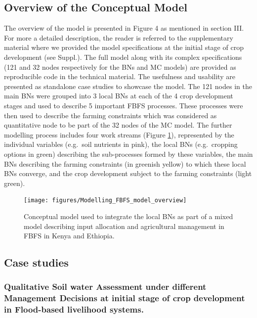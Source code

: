 \documentclass[11pt,preprint]{article}
\begin{document}
\hypertarget{overview-of-the-conceptual-model}{%
\subsection{Overview of the Conceptual
Model}\label{overview-of-the-conceptual-model}}

The overview of the model is presented in Figure 4 as mentioned in
section III. For more a detailed description, the reader is referred to
the supplementary material where we provided the model specifications at
the initial stage of crop development (see Suppl.). The full model along
with its complex specifications (121 and 32 nodes respectively for the
BNs and MC models) are provided as reproducible code in the technical
material. The usefulness and usability are presented as standalone case
studies to showcase the model. The 121 nodes in the main BNs were
grouped into 3 local BNs at each of the 4 crop development stages and
used to describe 5 important FBFS processes. These processes were then
used to describe the farming constraints which was considered as
quantitative node to be part of the 32 nodes of the MC model. The
further modelling process includes four work streams (Figure
\ref{Figure_4}), represented by the individual variables (e.g.~soil
nutrients in pink), the local BNs (e.g.~cropping options in green)
describing the sub-processes formed by these variables, the main BNs
describing the farming constraints (in greenish yellow) to which these
local BNs converge, and the crop development subject to the farming
constraints (light green).

\begin{figure}[!htbp]
    \centering
    \texttt{[image: figures/Modelling\_FBFS\_model\_overview]}
    \caption{Conceptual model used to integrate the local BNs as part of a mixed model describing     input allocation and agricultural management in FBFS in Kenya and Ethiopia.
    \label{Figure_4}}
\end{figure}

\hypertarget{case-studies}{%
\subsection{Case studies}\label{case-studies}}

\hypertarget{qualitative-soil-water-assessment-under-different-management-decisions-at-initial-stage-of-crop-development-in-flood-based-livelihood-systems.}{%
\subsubsection{Qualitative Soil water Assessment under different
Management Decisions at initial stage of crop development in Flood-based
livelihood
systems.}\label{qualitative-soil-water-assessment-under-different-management-decisions-at-initial-stage-of-crop-development-in-flood-based-livelihood-systems.}}
\end{document}
